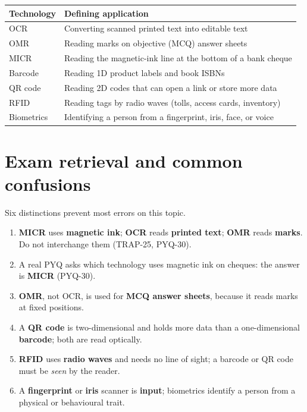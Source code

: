 \documentclass[11pt]{article}
\begin{document}
\begin{center}
\begin{tabular}{p{}p{}}
\toprule
\textbf{Technology} & \textbf{Defining application} \\
\midrule
OCR & Converting scanned printed text into editable text \\
OMR & Reading marks on objective (MCQ) answer sheets \\
MICR & Reading the magnetic-ink line at the bottom of a bank cheque \\
Barcode & Reading 1D product labels and book ISBNs \\
QR code & Reading 2D codes that can open a link or store more data \\
RFID & Reading tags by radio waves (tolls, access cards, inventory) \\
Biometrics & Identifying a person from a fingerprint, iris, face, or voice \\
\bottomrule
\end{tabular}
\end{center}

\section{Exam retrieval and common confusions}
Six distinctions prevent most errors on this topic.
\begin{enumerate}
  \item \textbf{MICR} uses \textbf{magnetic ink}; \textbf{OCR} reads
    \textbf{printed text}; \textbf{OMR} reads \textbf{marks}. Do not
    interchange them (TRAP-25, PYQ-30).
  \item A real PYQ asks which technology uses magnetic ink on cheques: the
    answer is \textbf{MICR} (PYQ-30).
  \item \textbf{OMR}, not OCR, is used for \textbf{MCQ answer sheets},
    because it reads marks at fixed positions.
  \item A \textbf{QR code} is two-dimensional and holds more data than a
    one-dimensional \textbf{barcode}; both are read optically.
  \item \textbf{RFID} uses \textbf{radio waves} and needs no line of sight;
    a barcode or QR code must be \emph{seen} by the reader.
  \item A \textbf{fingerprint} or \textbf{iris} scanner is \textbf{input};
    biometrics identify a person from a physical or behavioural trait.
\end{enumerate}
\end{document}
